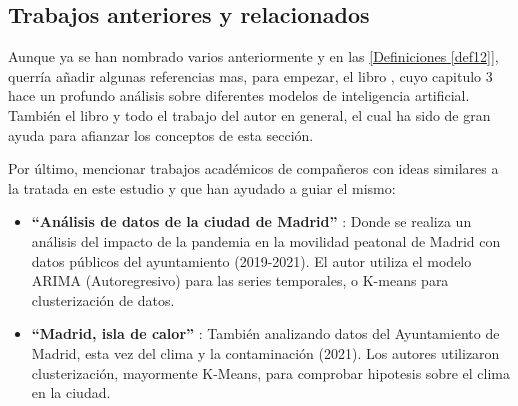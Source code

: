 \subsection{Trabajos anteriores y relacionados}
	
	Aunque ya se han nombrado varios anteriormente y en las \hyperref[def12]{[Definiciones \ref*{def12}]}, querría añadir algunas referencias mas, para empezar, el libro \citep{Fowdur2021}, cuyo capitulo 3 hace un profundo análisis sobre diferentes modelos de inteligencia artificial. También el libro \citep{Brownlee_2016_MMLA} y todo el trabajo del autor en general, el cual ha sido de gran ayuda para afianzar los conceptos de esta sección.

	Por último, mencionar trabajos académicos de compañeros con ideas similares a la tratada en este estudio y que han ayudado a guiar el mismo:
	\begin{itemize}
		\item \textbf{``Análisis de datos de la ciudad de Madrid''} \citep{SaizSantos2023}: Donde se realiza un análisis del impacto de la pandemia en la movilidad peatonal de Madrid con datos públicos del ayuntamiento (2019-2021). El autor utiliza el modelo ARIMA (Autoregresivo) para las series temporales, o K-means para clusterización de datos. %
		
		\item \textbf{``Madrid, isla de calor''} \citep{Meneses2023Madrid}: También analizando datos del Ayuntamiento de Madrid, esta vez del clima y la contaminación (2021). Los autores utilizaron clusterización, mayormente K-Means, para comprobar hipotesis sobre el clima en la ciudad.  %
		
	\end{itemize} 
	